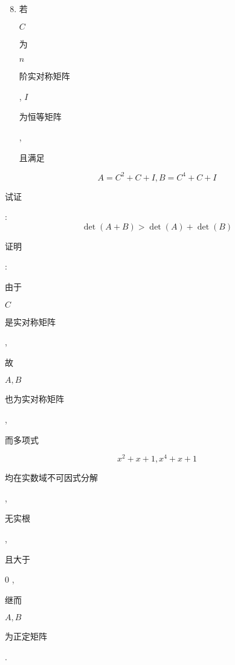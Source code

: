 \documentclass[10pt]{article}
\begin{document}
\begin{enumerate}
  \setcounter{enumi}{7}
  \item \begin{CJK}{UTF8}{mj}若\end{CJK} $C$ \begin{CJK}{UTF8}{mj}为\end{CJK} $n$ \begin{CJK}{UTF8}{mj}阶实对称矩阵\end{CJK}, $I$ \begin{CJK}{UTF8}{mj}为恒等矩阵\end{CJK}, \begin{CJK}{UTF8}{mj}且满足\end{CJK}
\end{enumerate}
$$
A=C^{2}+C+I, B=C^{4}+C+I
$$
\begin{CJK}{UTF8}{mj}试证\end{CJK}:
$$
\operatorname{det}(A+B)>\operatorname{det}(A)+\operatorname{det}(B)
$$
\begin{CJK}{UTF8}{mj}证明\end{CJK}: \begin{CJK}{UTF8}{mj}由于\end{CJK} $C$ \begin{CJK}{UTF8}{mj}是实对称矩阵\end{CJK}, \begin{CJK}{UTF8}{mj}故\end{CJK} $A, B$ \begin{CJK}{UTF8}{mj}也为实对称矩阵\end{CJK}, \begin{CJK}{UTF8}{mj}而多项式\end{CJK}
$$
x^{2}+x+1, x^{4}+x+1
$$
\begin{CJK}{UTF8}{mj}均在实数域不可因式分解\end{CJK}, \begin{CJK}{UTF8}{mj}无实根\end{CJK}, \begin{CJK}{UTF8}{mj}且大于\end{CJK} 0 , \begin{CJK}{UTF8}{mj}继而\end{CJK} $A, B$ \begin{CJK}{UTF8}{mj}为正定矩阵\end{CJK}.
\end{document}

